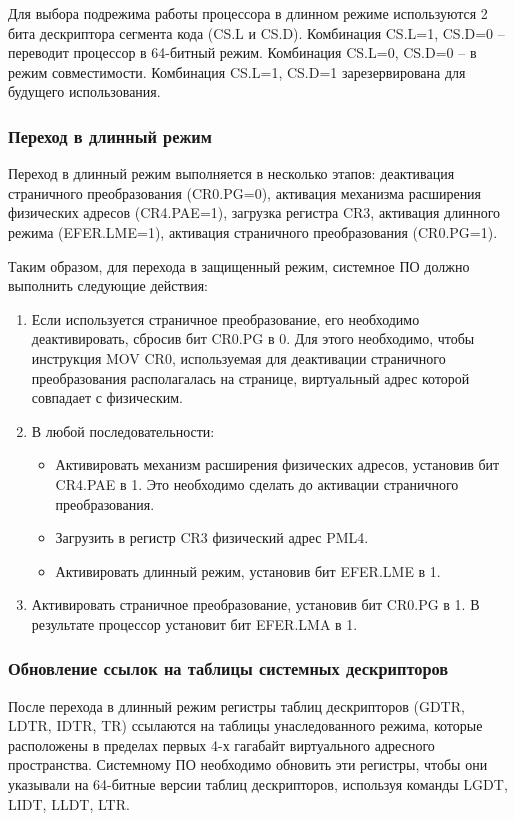 Для выбора подрежима работы процессора в длинном режиме используются 2 бита дескриптора сегмента кода (CS.L и CS.D).
Комбинация CS.L=1, CS.D=0 -- переводит процессор в 64-битный режим. Комбинация CS.L=0, CS.D=0 -- в
режим совместимости. Комбинация CS.L=1, CS.D=1 зарезервирована для будущего использования.

\subsubsection*{Переход в длинный режим}
Переход в длинный режим выполняется в несколько этапов: деактивация страничного преобразования (CR0.PG=0),
активация механизма расширения физических адресов (CR4.PAE=1), загрузка регистра CR3,
активация длинного режима (EFER.LME=1), активация страничного преобразования (CR0.PG=1).

Таким образом, для перехода в защищенный режим, системное ПО должно выполнить следующие действия:
\begin{enumerate}[1.]
\item Если используется страничное преобразование, его необходимо деактивировать, сбросив бит CR0.PG в 0.
	Для этого необходимо, чтобы инструкция MOV CR0, используемая для деактивации страничного преобразования
	располагалась на странице, виртуальный адрес которой совпадает с физическим.
\item В любой последовательности:
	\begin{itemize}
	\item Активировать механизм расширения физических адресов, установив бит CR4.PAE в 1. Это
		необходимо сделать до активации страничного преобразования.
	\item Загрузить в регистр CR3 физический адрес PML4.
	\item Активировать длинный режим, установив бит EFER.LME в 1.
	\end{itemize}
\item Активировать страничное преобразование, установив бит CR0.PG в 1. В результате процессор установит бит EFER.LMA в 1.
\end{enumerate}

\subsubsection*{Обновление ссылок на таблицы системных дескрипторов}
После перехода в длинный режим регистры таблиц дескрипторов (GDTR, LDTR, IDTR, TR) ссылаются на таблицы унаследованного
режима, которые расположены в пределах первых 4-х гагабайт виртуального адресного пространства. Системному ПО необходимо
обновить эти регистры, чтобы они указывали на 64-битные версии таблиц дескрипторов, используя команды LGDT, LIDT, LLDT, LTR.

